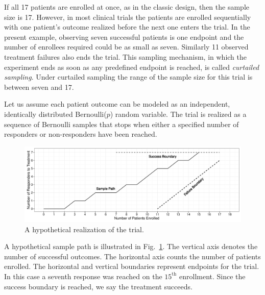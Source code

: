 \documentclass[review]{elsarticle}
\begin{document}
If all 17 patients are enrolled at once, as in the classic
design, then the sample size is 17. However, in most clinical trials the
patients are enrolled sequentially with one patient's outcome realized
before the next one enters the trial. In the present example, observing seven
successful patients is one endpoint and the number of enrollees required
could be as small as seven. Similarly 11
observed treatment failures also ends the trial. This sampling mechanism, in
which the experiment ends as soon as any predefined endpoint is reached, is
called {\em curtailed sampling}. Under curtailed sampling the range of the
sample size for this trial is between seven and 17.

Let us assume each patient outcome can be modeled as an independent,
identically distributed Bernoulli($p$) random variable. The trial is realized
as a sequence of Bernoulli samples that stops when either a
specified number of responders or non-responders have been reached. 

\begin{figure}[bp!]
\includegraphics[width=\textwidth]{KanePlot.pdf}
\caption{
A hypothetical realization of the trial.
}
\label{fig:kane_viz}
\end{figure}

A hypothetical sample path is illustrated in Fig.~\ref{fig:kane_viz}.
The vertical axis denotes the number of
successful outcomes. The horizontal axis counts the number of patients 
enrolled. The horizontal and vertical boundaries represent
endpoints for the trial. In this case a seventh response was reached on
the $15^{\text{th}}$ enrollment.
Since the success boundary is reached, we say the treatment succeeds.

\end{document}
